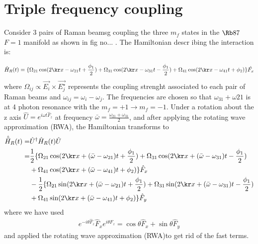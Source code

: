 
\section{Triple frequency coupling}
Consider 3 pairs of Raman beamsg coupling the three $m_f$ states in the $\Rb87$ $F=1$ manifold as shown in fig no... . The Hamiltonian descr ibing the interaction is: 

%
\begin{align}
\hat{H}_R(t) = \lbrace\Omega_{21}\cos(2\kr x-\omega_{21} t +\frac{\phi_1}{2})+\Omega_{31}\cos(2\kr x-\omega_{31} t-\frac{\phi_1}{2})+\Omega_{41}\cos(2\kr x-\omega_{41} t + \phi_2)\rbrace\hat{F_x}
\end{align}
%
%
where $\Omega_{ij}\propto \vec{E_i}\times\vec{E_j^{\star}}$ represents the coupling strenght associated to each pair of Raman beams and $\omega_{ij} = \omega_{i}-\omega_{j} $. The frequencies are chosen so that $\omega_{31} + \omega{21}$ is at 4 photon resonance with the $m_f = +1\rightarrow m_f = -1$. Under a rotation about the z axis $\hat{U} = e^{i\omega t\hat{F}_z}$ at frequency $\bar{\omega} = \frac{\omega_{21}+\omega_{31}}{2}$, and after applying the rotating wave approximation (RWA), the Hamiltonian transforms to 
%
%
\begin{align}
\begin{split}
\hat{\tilde{H}}_R(t) = & \hat{U}^{\dagger} \hat{H}_R(t)\hat{U} \\
                     = & \frac{1}{2}\lbrace\Omega_{21}\cos(2\kr x+(\bar{\omega}-\omega_{21}) t +\frac{\phi_1}{2})+\Omega_{31}\cos(2\kr x+(\bar{\omega}-\omega_{31}) t -\frac{\phi_1}{2}) \\
                     & +\Omega_{41}\cos(2\kr x+(\bar{\omega}-\omega_{41}) t + \phi_2)\rbrace \hat{F}_x \\
					& -  \frac{1}{2}\lbrace\Omega_{21}\sin(2\kr x+(\bar{\omega}-\omega_{21}) t +\frac{\phi_1}{2})+\Omega_{31}\sin(2\kr x+(\bar{\omega}-\omega_{31}) t-\frac{\phi_1}{2})\\
					&+\Omega_{41}\sin(2\kr x+(\bar{\omega}-\omega_{41}) t+\phi_2)\rbrace \hat{F}_y
\end{split}
\end{align}
%
%
where we have used 
%
\begin{align}
e^{-i\theta \hat{F}_z} \hat{F}_x e^{i\theta \hat{F}_z}= \cos\theta \hat{F}_x + \sin\theta\hat{F}_y
\end{align}
%
and applied the rotating wave approximation (RWA)to get rid of the fast terms. 


